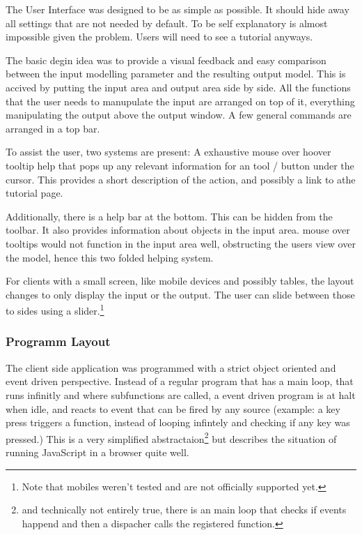 The User Interface was designed to be as simple as possible.
It should hide away all settings that are not needed by default.
To be self explanatory is almost impossible given the problem.
Users will need to see a tutorial anyways.

The basic degin idea was to provide a visual feedback and easy comparison between the input modelling parameter and the resulting output model.
This is accived by putting the input area and output area side by side.
All the functions that the user needs to manupulate the input are arranged on top of it, everything manipulating the output above the output window.
A few general commands are arranged in a top bar.

To assist the user, two systems are present: A exhaustive mouse over hoover tooltip help that pops up any relevant information for an tool / button under the cursor.
This provides a short description of the action, and possibly a link to athe tutorial page.

Additionally, there is a help bar at the bottom. This can be hidden from the toolbar.
It also provides information about objects in the input area.
mouse over tooltips would not function in the input area well, obstructing the users view over the model, hence this two folded helping system.

For clients with a small screen, like mobile devices and possibly tables, the layout changes to only display the input or the output. The user can slide between those to sides using a slider.\footnote{Note that mobiles weren't tested and are not officially supported yet.}


\subsubsection{Programm Layout}
\label{sec:client_prog_layout}

The client side application was programmed with a strict object oriented and event driven perspective.
Instead of a regular program that has a main loop, that runs infinitly and where subfunctions are called, a event driven program is at halt when idle, and reacts to event that can be fired by any source (example: a key press triggers a function, instead of looping infintely and checking if any key was pressed.)
This is a very simplified abstractaion\footnote{and technically not entirely true, there is an main loop that checks if events happend and then a dispacher calls the registered function.} but describes the situation of running JavaScript in a browser quite well.

